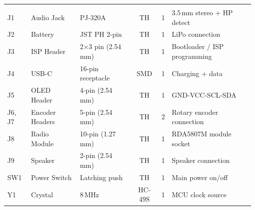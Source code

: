 \begin{longtable}{
  >{\ttfamily\small}l
  >{\raggedright\arraybackslash\small}p{3.2cm}
  >{\raggedright\arraybackslash\small}p{2.8cm}
  >{\small}c
  >{\small}c
  >{\raggedright\arraybackslash\small}p{3.8cm}
}
\rowcolor{tablehead!15}
\multicolumn{6}{l}{\textbf{\color{brandteal}Connectors \& Mechanical}} \\
J1 & Audio Jack & PJ-320A & TH & 1 & 3.5\,mm stereo + HP detect \\
J2 & Battery & JST PH 2-pin & TH & 1 & LiPo connection \\
J3 & ISP Header & 2$\times$3 pin (2.54\,mm) & TH & 1 & Bootloader / ISP programming \\
J4 & USB-C & 16-pin receptacle & SMD & 1 & Charging + data \\
J5 & OLED Header & 4-pin (2.54\,mm) & TH & 1 & GND-VCC-SCL-SDA \\
J6, J7 & Encoder Headers & 5-pin (2.54\,mm) & TH & 2 & Rotary encoder connection \\
J8 & Radio Module & 10-pin (1.27\,mm) & TH & 1 & RDA5807M module socket \\
J9 & Speaker & 2-pin (2.54\,mm) & TH & 1 & Speaker connection \\
SW1 & Power Switch & Latching push & TH & 1 & Main power on/off \\
Y1 & Crystal & 8\,MHz & HC-49S & 1 & MCU clock source \\

\end{longtable}

